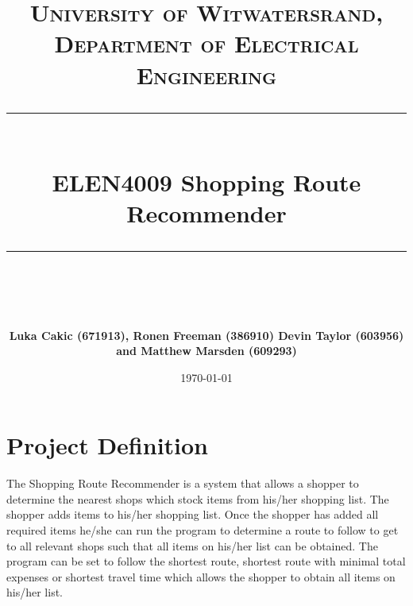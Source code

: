 \documentclass[10pt, a4paper, onecolumn]{scrartcl}
\newcommand{\horrule}[1]{\rule{\linewidth}{#1}}
\begin{document}
		\title{\normalfont \normalsize
			\textsc{University of Witwatersrand, Department of Electrical Engineering} \\ [10pt]
			\horrule{0.5pt} \\ [10pt]
			\huge ELEN4009 Shopping Route Recommender \\
			\horrule{2pt} \\ [10pt]}
		\author{\textbf{\normalsize{Luka Cakic (671913), Ronen Freeman (386910) Devin Taylor (603956) and Matthew Marsden (609293)}} \\ [10pt]}
		\date {\normalsize \today}
		
		\maketitle
		
%		
%		
%
%			
%	
		
	\section{Project Definition}
		
		The Shopping Route Recommender is a system that allows a shopper to determine the nearest shops which stock items from his/her shopping list. The shopper adds items to his/her shopping list. Once the shopper has added all required items he/she can run the program to determine a route to follow to get to all relevant shops such that all items on his/her list can be obtained. The program can be set to follow the shortest route, shortest route with minimal total expenses or shortest travel time which allows the shopper to obtain all items on his/her list.
				
\end{document}
